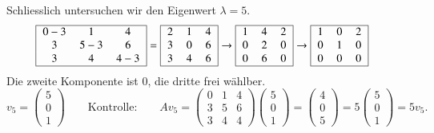 Schliesslich untersuchen wir den Eigenwert $\lambda=5$.
\begin{align*}
\begin{tabular}{|>{$}c<{$}>{$}c<{$}>{$}c<{$}|}
\hline
0-3&1&4\\
3&5-3&6\\
3&4&4-3\\
\hline
\end{tabular}
&=
\begin{tabular}{|>{$}c<{$}>{$}c<{$}>{$}c<{$}|}
\hline
2&1&4\\
3&0&6\\
3&4&6\\
\hline
\end{tabular}
\rightarrow
\begin{tabular}{|>{$}c<{$}>{$}c<{$}>{$}c<{$}|}
\hline
1&4&2\\
0&2&0\\
0&6&0\\
\hline
\end{tabular}
\rightarrow
\begin{tabular}{|>{$}c<{$}>{$}c<{$}>{$}c<{$}|}
\hline
1&0&2\\
0&1&0\\
0&0&0\\
\hline
\end{tabular}
\end{align*}
Die zweite Komponente ist $0$, die dritte frei wählber.
\[
v_5
=
\begin{pmatrix}5\\0\\1\end{pmatrix}
\qquad\text{Kontrolle:}\qquad
Av_5
=
\begin{pmatrix}
0&1&4\\
3&5&6\\
3&4&4
\end{pmatrix}
\begin{pmatrix}5\\0\\1\end{pmatrix}
=
\begin{pmatrix}4\\0\\5\end{pmatrix}
=
5\begin{pmatrix}5\\0\\1\end{pmatrix}
=
5v_5.
\]









